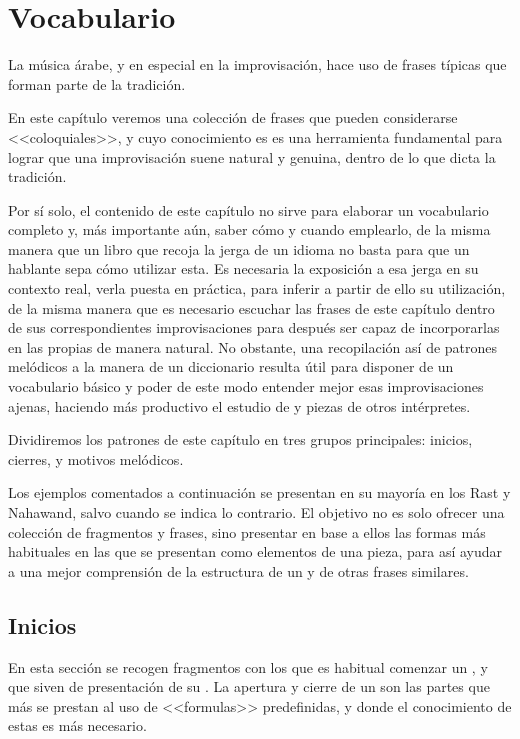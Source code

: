 \chapter{Vocabulario}


La música árabe, y en especial en la improvisación, hace uso de frases típicas que forman parte de la tradición.

En este capítulo veremos una colección de frases que pueden considerarse <<coloquiales>>, y cuyo conocimiento es es una herramienta fundamental para lograr que una improvisación suene natural y genuina, dentro de lo que dicta la tradición.

Por sí solo, el contenido de este capítulo no sirve para elaborar un vocabulario completo y, más importante aún, saber cómo y cuando emplearlo, de la misma manera que un libro que recoja la jerga de un idioma no basta para que un hablante sepa cómo utilizar esta. Es necesaria la exposición a esa jerga en su contexto real, verla puesta en práctica, para inferir a partir de ello su utilización, de la misma manera que es necesario escuchar las frases de este capítulo dentro de sus correspondientes improvisaciones para después ser capaz de incorporarlas en las propias de manera natural. No obstante, una recopilación así de patrones melódicos a la manera de un diccionario resulta útil para disponer de un vocabulario básico y poder de este modo entender mejor esas improvisaciones ajenas, haciendo más productivo el estudio de \taqasim y piezas de otros intérpretes.

Dividiremos los patrones de este capítulo en tres grupos principales: inicios, cierres, y motivos melódicos.

Los ejemplos comentados a continuación se presentan en su  mayoría en los \maqamaat Rast y Nahawand, salvo cuando se indica lo contrario. El objetivo no es solo ofrecer una colección de fragmentos y frases, sino presentar en base a ellos las formas más habituales en las que se presentan como elementos de una pieza, para así ayudar a una mejor comprensión de la estructura de un \taqsim y de otras frases similares.

\section{Inicios}

En esta sección se recogen fragmentos con los que es habitual comenzar un \taqsimb, y que siven de presentación de su \maqamb. La apertura y cierre de un \taqsim son las partes que más se prestan al uso de <<formulas>> predefinidas, y donde el conocimiento de estas es más necesario.

